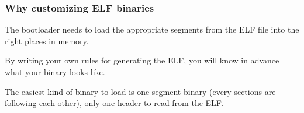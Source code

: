 
\begin{frame}
  \frametitle{Why customizing ELF binaries}

  The bootloader needs to load the appropriate segments from the ELF
  file into the right places in memory.

  \-

  By writing your own rules for generating the ELF, you will know in
  advance what your binary looks like.

  \-

  The easiest kind of binary to load is one-segment binary (every
  sections are following each other), only one header to read from the
  ELF.

\end{frame}
